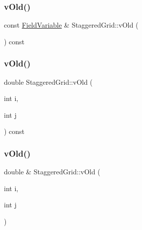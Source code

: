 \mbox{\label{classStaggeredGrid_a53df6ed75cf3021d50593a04c9d7f390}} 
\subsubsection{\texorpdfstring{vOld()}{vOld()}\hspace{0.1cm}{\footnotesize\ttfamily [1/3]}}
{\footnotesize\ttfamily const \mbox{\hyperlink{classFieldVariable}{Field\+Variable}} \& Staggered\+Grid\+::v\+Old (\begin{DoxyParamCaption}{ }\end{DoxyParamCaption}) const}

\mbox{\label{classStaggeredGrid_aa8a51f53c4b02d938bba9485e3708999}} 
\subsubsection{\texorpdfstring{vOld()}{vOld()}\hspace{0.1cm}{\footnotesize\ttfamily [2/3]}}
{\footnotesize\ttfamily double Staggered\+Grid\+::v\+Old (\begin{DoxyParamCaption}\item[{int}]{i,  }\item[{int}]{j }\end{DoxyParamCaption}) const}

\mbox{\label{classStaggeredGrid_a585291cfec3161c849e1cd9fac4199d8}} 
\subsubsection{\texorpdfstring{vOld()}{vOld()}\hspace{0.1cm}{\footnotesize\ttfamily [3/3]}}
{\footnotesize\ttfamily double \& Staggered\+Grid\+::v\+Old (\begin{DoxyParamCaption}\item[{int}]{i,  }\item[{int}]{j }\end{DoxyParamCaption})}



